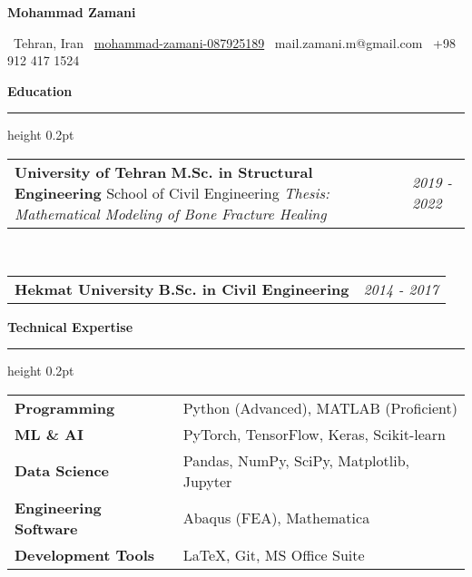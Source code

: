 \documentclass[11pt]{article}
\newlength{\sectionspace}
\newcommand{\name}[1]{{\huge\bfseries\color{headerblue} #1}\par\vspace{0.3em}}
\newenvironment{rSection}[1]{
    \vspace{0.8em}
    {\large\bfseries\color{sectiongray} #1}
    \vspace{0.2em}
    \hrule height 0.2pt
    \vspace{0.5em}
}{
    \vspace{0.3em}
}
\begin{document}
\begin{center}
\name{Mohammad Zamani}
\end{center}

\begin{center}
\begin{minipage}{0.95\textwidth}
    \centering
    \small
    \faMapMarker\ Tehran, Iran \quad
    \faLinkedin\ \href{https://linkedin.com/in/mohammad-zamani-087925189}{mohammad-zamani-087925189} \quad
    \faEnvelope\ mail.zamani.m@gmail.com \quad
    \faPhone\ +98 912 417 1524
\end{minipage}
\end{center}

\vspace{0.8em}

\begin{rSection}{Education}
\begin{tabular}{@{}p{}@{}p{}@{}}
    \textbf{University of Tehran} \newline
    \textbf{M.Sc. in Structural Engineering} \newline
    School of Civil Engineering \newline
    \small{\textit{Thesis: Mathematical Modeling of Bone Fracture Healing}} &
    \raggedleft \em 2019 - 2022 \\
\end{tabular} \\
\vspace{\sectionspace}

\begin{tabular}{@{}p{}@{}p{}@{}}
    \textbf{Hekmat University} \newline
    \textbf{B.Sc. in Civil Engineering} &
    \raggedleft \em 2014 - 2017 \\
\end{tabular}
\end{rSection}

\begin{rSection}{Technical Expertise}
\begin{tabular}{@{} l @{\hspace{6ex}} l}
\textbf{\color{accentblue}Programming} & Python (Advanced), MATLAB (Proficient) \\[0.2em]
\textbf{\color{accentblue}ML \& AI} & PyTorch, TensorFlow, Keras, Scikit-learn \\[0.2em]
\textbf{\color{accentblue}Data Science} & Pandas, NumPy, SciPy, Matplotlib, Jupyter \\[0.2em]
\textbf{\color{accentblue}Engineering Software} & Abaqus (FEA), Mathematica \\[0.2em]
\textbf{\color{accentblue}Development Tools} & LaTeX, Git, MS Office Suite
\end{tabular}
\end{rSection}
\end{document}
